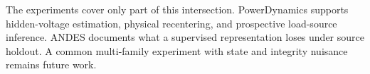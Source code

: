 The experiments cover only part of this intersection. PowerDynamics supports hidden-voltage estimation, physical recentering, and prospective load-source inference. ANDES documents what a supervised representation loses under source holdout. A common multi-family experiment with state and integrity nuisance remains future work.
